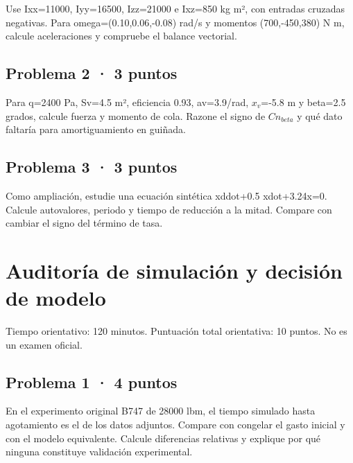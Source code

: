 Use Ixx=11000, Iyy=16500, Izz=21000 e Ixz=850 kg m², con entradas cruzadas negativas. Para omega=(0.10,0.06,-0.08) rad/s y momentos (700,-450,380) N m, calcule aceleraciones y compruebe el balance vectorial.


\section{Problema 2 · 3 puntos}

Para q=2400 Pa, Sv=4.5 m², eficiencia 0.93, av=3.9/rad, $x_{v}$=-5.8 m y beta=2.5 grados, calcule fuerza y momento de cola. Razone el signo de $Cn_{beta}$ y qué dato faltaría para amortiguamiento en guiñada.


\section{Problema 3 · 3 puntos}

Como ampliación, estudie una ecuación sintética xddot+0.5 xdot+3.24x=0. Calcule autovalores, periodo y tiempo de reducción a la mitad. Compare con cambiar el signo del término de tasa.


\chapter{Auditoría de simulación y decisión de modelo}

Tiempo orientativo: 120 minutos. Puntuación total orientativa: 10 puntos. No es un examen oficial.

\section{Problema 1 · 4 puntos}

En el experimento original B747 de 28000 lbm, el tiempo simulado hasta agotamiento es el de los datos adjuntos. Compare con congelar el gasto inicial y con el modelo equivalente. Calcule diferencias relativas y explique por qué ninguna constituye validación experimental.

